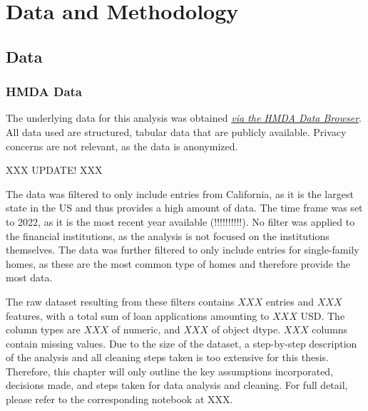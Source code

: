 \chapter{Data and Methodology}\label{ch:Data_and_Methodology}



\section{Data}\label{sec:Data}



\subsection{HMDA Data}\label{subsec:HMDA_Data}


The underlying data for this analysis was obtained \textit{\href{https://ffiec.cfpb.gov/data-browser/data/2022?category=states}{via the HMDA Data Browser}}. \@
All data used are structured, tabular data that are publicly available. Privacy concerns are not relevant, as the data is anonymized.

XXX UPDATE! XXX

The data was filtered to only include entries from California, as it is the largest state in the US and thus provides a high amount of data. 
The time frame was set to 2022, as it is the most recent year available (!!!!!!!!!!). No filter was applied to the financial institutions, as the analysis is not focused on the institutions themselves. 
The data was further filtered to only include entries for single-family homes, as these are the most common type of homes and therefore provide the most data.

The raw dataset resulting from these filters contains $XXX$ entries and $XXX$ features, with a total sum of loan applications amounting to $XXX$ USD. The column types are $XXX$ of numeric, and $XXX$ of object dtype. $XXX$ columns contain missing values. \@
Due to the size of the dataset, a step-by-step description of the analysis and all cleaning steps taken is too extensive for this thesis. Therefore, this chapter will only outline the key assumptions incorporated, decisions made, and steps taken for data analysis and cleaning. For full detail, please refer to the corresponding notebook at XXX.

